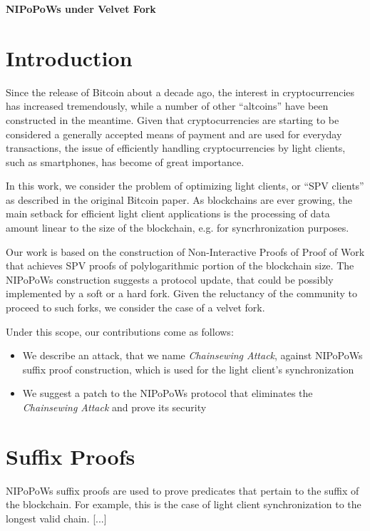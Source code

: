 \documentclass[9pt,a4paper]{article}
\begin{document}
\begin{center}
\begin{Large}
\textbf{NIPoPoWs under Velvet Fork\\}
\end{Large}

\end{center}

\section{Introduction}
Since the release of Bitcoin about a decade ago, the interest in cryptocurrencies has increased tremendously, while a number of other ``altcoins'' have been constructed in the meantime. Given that cryptocurrencies are starting to be considered a generally accepted means of payment and are used for everyday transactions, the issue of efficiently handling cryptocurrencies by light clients, such as smartphones, has become of great importance.

In this work, we consider the problem of optimizing light clients, or ``SPV clients'' as described in the original Bitcoin paper\cite{Nakamoto}. As blockchains are ever growing, the main setback for efficient light client applications is the processing of data amount linear to the size of the blockchain, e.g. for syncrhronization purposes. 

Our work is based on the construction of Non-Interactive Proofs of Proof of Work\cite{NIPoPoWs} that achieves SPV proofs of polylogarithmic portion of the blockchain size. The NIPoPoWs construction suggests a protocol update, that could be possibly implemented by a soft or a hard fork. Given the reluctancy of the community to proceed to such forks, we consider the case of a velvet fork\cite{NIPoPoWs}\cite{Zamyatin}.

Under this scope, our contributions come as follows:
\begin{itemize}
	\item We describe an attack, that we name \textit{Chainsewing Attack}, against NIPoPoWs suffix proof construction, which is used for the light client's synchronization
	\item We suggest a patch to the NIPoPoWs protocol that eliminates the \textit{Chainsewing Attack} and prove its security
\end{itemize}

\section{Suffix Proofs}
NIPoPoWs suffix proofs are used to prove predicates that pertain to the suffix of the blockchain. For example, this is the case of light client synchronization to the longest valid chain.
 [...]
 
\end{document}
